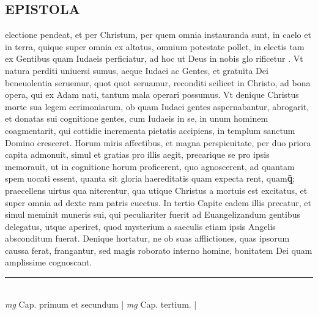 \documentclass{article}
\begin{document}
\begin{pages}
\section*{EPISTOLA }\pstart electione pendeat, et per Christum, per quem omnia instauranda sunt, in caelo et in terra, quique super omnia ex altatus, omnium potestate pollet, in electis tam ex Gentibus quam Iudaeis perficiatur, ad hoc ut Deus in nobis glo rificetur .  Vt natura perditi uniuersi sumus, aeque Iudaei ac Gentes, et gratuita Dei beneuolentia seruemur, quot quot seruamur, reconditi scilicet in Christo, ad bona opera, qui ex Adam nati, tantum mala operari possumus.  Vt denique Christus morte sua legem cerimoniarum, ob quam Iudaei gentes aspernabantur, abrogarit, et donatas sui cognitione gentes, cum Iudaeis in se, in unum hominem coagmentarit, qui cottidie incrementa pietatis accipiens, in templum sanctum Domino cresceret.   \pend\pstart Horum miris affectibus, et magna perspicuitate, per duo priora capita admonuit, simul et gratias pro illis aegit, precarique se pro ipsis memorauit, ut in cognitione horum proficerent, quo agnoscerent, ad quantam spem uocati essent, quanta sit gloria haereditatis quam expecta rent, quamꝗ̃; praecellens uirtus qua niterentur, qua utique Christus a mortuis est excitatus, et super omnia ad dexte ram patris euectus.  In tertio Capite eadem illis precatur, et simul meminit muneris sui, qui peculiariter fuerit ad Euangelizandum gentibus delegatus, utque aperiret, quod mysterium a saeculis etiam ipsis Angelis absconditum fuerat.  Denique hortatur, ne ob suas afflictiones, quas ipsorum caussa ferat, frangantur, sed magis roborato interno homine, bonitatem Dei quam amplissime cognoscant.   \pend
\vspace{0.5cm}\noindent
\vspace{0.2cm}\rule{1cm}{0.2pt}\\ 
\hspace{0.2cm}\textit{mg}
\footnotesize Cap. primum et secundum 
\normalsize| 
\hspace{0.2cm}\textit{mg}
\footnotesize Cap.  tertium.  
\normalsize| 

\end{pages}
\end{document}
